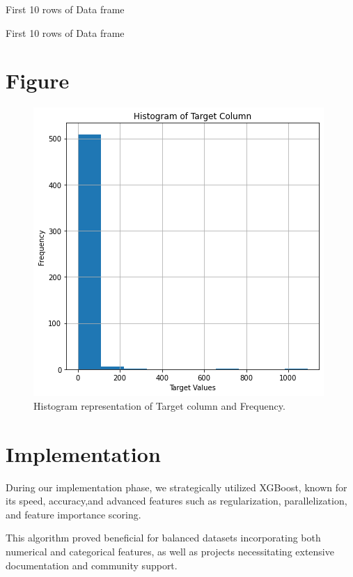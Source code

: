 \clearpage
First 10 rows of Data frame
\begin{table}[ht!]
    \centering
    
    \label{tab:DataFrame}
    \caption{First 10 rows of Data frame}
\end{table}

\clearpage
\section{Figure}
\begin{figure}[ht]
    \centering
    \includegraphics[scale=0.9]{figures/output_14_0.png}
    \caption{Histogram representation of Target column and Frequency.}
\end{figure}


\clearpage
\section {Implementation}
During our implementation phase, we strategically utilized XGBoost, known for its speed, accuracy,and advanced features such as regularization, parallelization, and feature importance scoring. 

This algorithm proved beneficial for balanced datasets incorporating both numerical and categorical features, as well as projects necessitating extensive documentation and community support.

